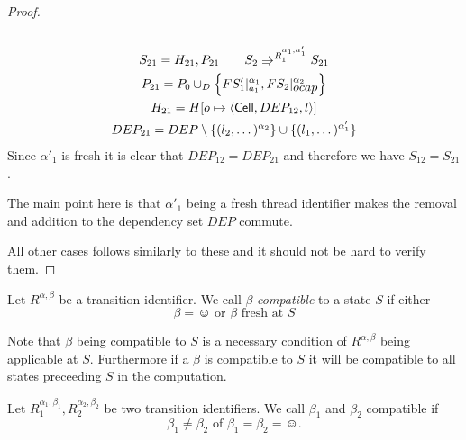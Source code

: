 \begin{proof}
\begin{description}
\begin{equation}
\begin{gathered}
        \end{gathered}
      \end{equation}
      \begin{equation} 
        \begin{gathered}
          S_{21} = H_{21}, P_{21} \quad\quad S_2 \Rrightarrow^{R_1^{\alpha_1,
          \alpha'_1}} S_{21}
          \\
          P_{21} = P_0 \cup_D \left\{ FS'_1|_{a_1}^{\alpha_1},
          FS_2|_{\mbox{$ocap$}}^{\alpha_2} \right\} \\
          H_{21} = H[o \mapsto \mbox{$\langle \mbox{$\mathsf{Cell}$}{}, DEP_{12}, l \rangle$}] \\ 
          DEP_{21} = DEP \setminus \{ (l_2, \dots)^{\alpha_2} \} \cup \{ (l_1,
          \dots)^{\alpha'_1} \} 
        \end{gathered}
      \end{equation}
      Since $\alpha'_1$ is fresh it is clear that $DEP_{12} = DEP_{21}$ and
      therefore we have $S_{12} = S_{21}$.
      \begin{remark}
        The main point here is that $\alpha'_1$ being a fresh thread identifier
        makes the removal and addition to the dependency set $DEP$ commute.
      \end{remark}
  \end{description}
  All other cases follows similarly to these and it should not be hard to verify
  them.
\end{proof}

\begin{definition} \label{def:betacompat}
  Let $R^{\alpha, \beta}$ be a transition
  identifier. We call $\beta$ \emph{compatible} to a state $S$ if either
  \begin{equation*}
    \beta = \smiley \text{ or } \beta \text{ fresh at } S
  \end{equation*}
\end{definition}
\begin{remark}
  Note that $\beta$ being compatible to $S$ is a necessary condition of
  $R^{\alpha, \beta}$ being applicable at $S$. Furthermore if a $\beta$ is
  compatible to $S$ it will be compatible to all states preceeding $S$ in the
  computation.
\end{remark}

\begin{definition}
  Let $R_1^{\alpha_1, \beta_1}, R_2^{\alpha_2, \beta_2}$ be two transition
  identifiers. We call $\beta_1$ and $\beta_2$ compatible if
  \begin{equation*}
    \beta_1 \neq \beta_2 \text{ of } \beta_1 = \beta_2 = \smiley.
  \end{equation*}
\end{definition}


